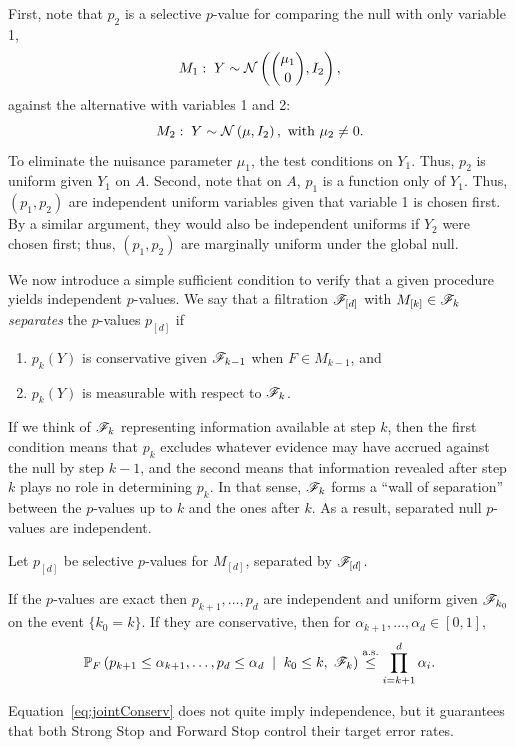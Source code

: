 \documentclass{article}
\begin{document}
First, note that $p_2$ is a selective $p$-value for comparing the null with only variable 1,
\[
M_1:\; Y \sim \mathcal{N}\left(\binom{\mu_1}{0}, I_2\right),
\]
against the alternative with variables 1 and 2:
\[
M_2:\; Y \sim \mathcal{N}\left(\mu, I_2\right), \text{ with } 
\mu_2 \neq 0.
\]
To eliminate the nuisance parameter $\mu_1$, the test conditions on $Y_1$. Thus, $p_2$ is uniform given $Y_1$ on $A$. Second, note that on $A$, $p_1$ is a function only of $Y_1$. Thus, $(p_1,p_2)$ are independent uniform variables given that variable 1 is chosen first. By a similar argument, they would also be independent uniforms if $Y_2$ were chosen first; thus, $(p_1, p_2)$ are marginally uniform under the global null.

We now introduce a simple sufficient condition to verify that a given procedure yields independent $p$-values. We say that a filtration $\mathscr{F}_{[d]}$ with $M_{[k]} \in \mathscr{F}_k$ {\em separates} the $p$-values $p_{[d]}$ if 
\begin{enumerate}
\item $p_k(Y)$ is conservative given $\mathscr{F}_{k-1}$ 
  when $F\in M_{k-1}$, and
\item $p_k(Y)$ is measurable with respect to $\mathscr{F}_k$.
\end{enumerate}
If we think of $\mathscr{F}_k$ representing information available at step $k$, then the first condition means that $p_k$ excludes whatever evidence may have accrued against the null by step $k-1$, and the second means that information revealed after step $k$ plays no role in determining $p_k$. In that sense, $\mathscr{F}_k$ forms a ``wall of separation'' between the $p$-values up to $k$ and the ones after $k$. As a result, separated null $p$-values are independent.

\begin{proposition}\label{prop:jointConserv}

  Let $p_{[d]}$ be selective $p$-values for $M_{[d]}$, 
  separated by $\mathscr{F}_{[d]}$.

  If the $p$-values are exact then $p_{k+1}, \ldots, p_d$ are
  independent and uniform given $\mathscr{F}_{k_0}$ on the event $\{k_0=k\}$.
  If they are conservative, then for
  $\alpha_{k+1},\ldots,\alpha_d \in [0,1]$,
  \begin{equation}\label{eq:jointConserv}
  \mathbb{P}_F\left(p_{k+1}\leq \alpha_{k+1}, \ldots, p_d \leq \alpha_d\;
    \mid\; k_0 \leq k, \; \mathscr{F}_k\right) \overset{\textrm{a.s.}}{\leq} \prod_{i=k+1}^d
  \alpha_i.
  \end{equation}
\end{proposition}
Equation~\ref{eq:jointConserv} does not quite imply independence, but it guarantees that both Strong Stop and Forward Stop control their target error rates.
\end{document}
